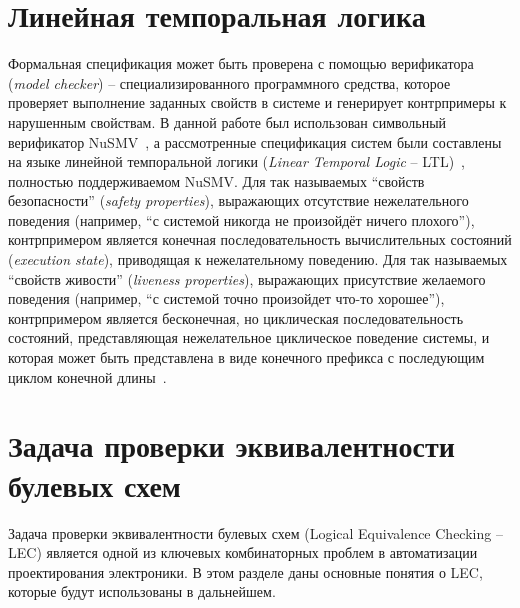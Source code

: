 

\section{Линейная темпоральная логика}%
\label{sub:ltl}


Формальная спецификация может быть проверена с помощью верификатора (\textit{model checker}) \--- специализированного программного средства, которое проверяет выполнение заданных свойств в системе и генерирует контрпримеры к нарушенным свойствам.
В данной работе был использован символьный верификатор NuSMV~\cite{NuSMV}, а рассмотренные спецификация систем были составлены на языке линейной темпоральной логики (\textit{Linear Temporal Logic} \--- LTL)~\cite{ltl}, полностью поддерживаемом NuSMV\@.
Для так называемых \enquote{свойств безопасности} (\textit{safety properties}), выражающих отсутствие нежелательного поведения (например, \enquote{с системой никогда не произойдёт ничего плохого}), контрпримером является конечная последовательность вычислительных состояний (\textit{execution state}), приводящая к нежелательному поведению.
Для так называемых \enquote{свойств живости} (\textit{liveness properties}), выражающих присутствие желаемого поведения (например, \enquote{с системой точно произойдет что-то хорошее}), контрпримером является бесконечная, но циклическая последовательность состояний, представляющая нежелательное циклическое поведение системы, и которая может быть представлена в виде конечного префикса с последующим циклом конечной длины~\cite{clarke1999}.


\section{Задача проверки эквивалентности булевых схем}
\label{sub:lec}

Задача проверки эквивалентности булевых схем (Logical Equivalence Checking \--- LEC) является одной из ключевых комбинаторных проблем в автоматизации проектирования электроники.
В этом разделе даны основные понятия о LEC, которые будут использованы в дальнейшем.

